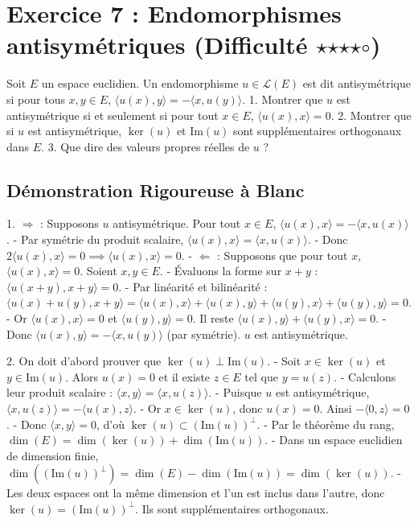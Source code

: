 \documentclass{report}
\begin{document}
\newpage


\chapter*{Exercice 7 : Endomorphismes antisymétriques (Difficulté $\star$$\star$$\star$$\star$$\circ$)}

Soit $E$ un espace euclidien. Un endomorphisme $u \in \mathcal{L}(E)$ est dit antisymétrique si pour tous $x, y \in E$, $\langle u(x), y \rangle = - \langle x, u(y) \rangle$.
1. Montrer que $u$ est antisymétrique si et seulement si pour tout $x \in E$, $\langle u(x), x \rangle = 0$.
2. Montrer que si $u$ est antisymétrique, $\ker(u)$ et $\text{Im}(u)$ sont supplémentaires orthogonaux dans $E$.
3. Que dire des valeurs propres réelles de $u$ ?

\section*{Démonstration Rigoureuse à Blanc}

1. $\Rightarrow$ : Supposons $u$ antisymétrique. Pour tout $x \in E$, $\langle u(x), x \rangle = - \langle x, u(x) \rangle$.
   - Par symétrie du produit scalaire, $\langle u(x), x \rangle = \langle x, u(x) \rangle$.
   - Donc $2 \langle u(x), x \rangle = 0 \implies \langle u(x), x \rangle = 0$.
   - $\Leftarrow$ : Supposons que pour tout $x$, $\langle u(x), x \rangle = 0$. Soient $x, y \in E$.
   - Évaluons la forme sur $x+y$ : $\langle u(x+y), x+y \rangle = 0$.
   - Par linéarité et bilinéarité : $\langle u(x) + u(y), x + y \rangle = \langle u(x), x \rangle + \langle u(x), y \rangle + \langle u(y), x \rangle + \langle u(y), y \rangle = 0$.
   - Or $\langle u(x), x \rangle = 0$ et $\langle u(y), y \rangle = 0$. Il reste $\langle u(x), y \rangle + \langle u(y), x \rangle = 0$.
   - Donc $\langle u(x), y \rangle = - \langle x, u(y) \rangle$ (par symétrie). $u$ est antisymétrique.

2. On doit d'abord prouver que $\ker(u) \perp \text{Im}(u)$.
   - Soit $x \in \ker(u)$ et $y \in \text{Im}(u)$. Alors $u(x) = 0$ et il existe $z \in E$ tel que $y = u(z)$.
   - Calculons leur produit scalaire : $\langle x, y \rangle = \langle x, u(z) \rangle$.
   - Puisque $u$ est antisymétrique, $\langle x, u(z) \rangle = -\langle u(x), z \rangle$.
   - Or $x \in \ker(u)$, donc $u(x) = 0$. Ainsi $-\langle 0, z \rangle = 0$.
   - Donc $\langle x, y \rangle = 0$, d'où $\ker(u) \subset (\text{Im}(u))^\perp$.
   - Par le théorème du rang, $\dim(E) = \dim(\ker(u)) + \dim(\text{Im}(u))$.
   - Dans un espace euclidien de dimension finie, $\dim((\text{Im}(u))^\perp) = \dim(E) - \dim(\text{Im}(u)) = \dim(\ker(u))$.
   - Les deux espaces ont la même dimension et l'un est inclus dans l'autre, donc $\ker(u) = (\text{Im}(u))^\perp$. Ils sont supplémentaires orthogonaux.
\end{document}
